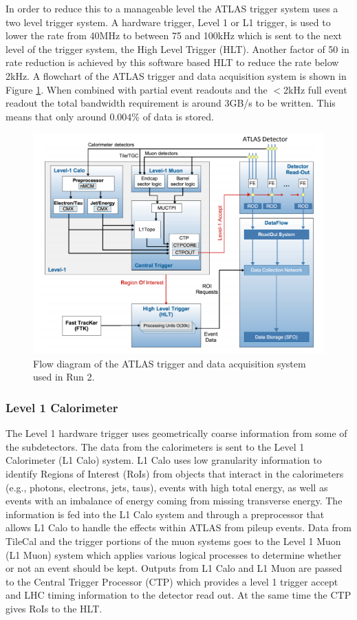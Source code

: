 In order to reduce this to a manageable level the ATLAS trigger system uses a two level trigger system.  A hardware trigger, Level 1 or L1 trigger, is used to lower the rate from 40MHz to between 75 and 100kHz which is sent to the next level of the trigger system, the High Level Trigger (HLT).  Another factor of 50 in rate reduction is achieved by this software based HLT to reduce the rate below 2kHz.  A flowchart of the ATLAS trigger and data acquisition system is shown in Figure \ref{fig:ATLAStdaq}.  When combined with partial event readouts and the $<$2kHz full event readout the total bandwidth requirement is around 3GB/s to be written.  This means that only around $0.004\%$ of data is stored.
\begin{figure}[ht!]
	\centering
	\includegraphics[width=\columnwidth]{../ThesisImages/LHCImages/ATLASTDAQR2.png}
	\caption[Flow diagram of the ATLAS trigger and data acquisition system used in Run 2.]{Flow diagram of the ATLAS trigger and data acquisition system used in Run 2\cite{ATLASTDAQ}.
	}
	\label{fig:ATLAStdaq}
\end{figure}

\subsubsection{Level 1 Calorimeter}
The Level 1 hardware trigger uses geometrically coarse information from some of the subdetectors.  The data from the calorimeters is sent to the Level 1 Calorimeter (L1 Calo) system.  L1 Calo uses low granularity information to identify Regions of Interest (RoIs) from objects that interact in the calorimeters (e.g., photons, electrons, jets, taus), events with high total energy, as well as events with an imbalance of energy coming from missing transverse energy.  The information is fed into the L1 Calo system and through a preprocessor that allows L1 Calo to handle the effects within ATLAS from pileup events.
Data from TileCal and the trigger portions of the muon systems goes to the Level 1 Muon (L1 Muon) system which applies various logical processes to determine whether or not an event should be kept.  
Outputs from L1 Calo and L1 Muon are passed to the Central Trigger Processor (CTP) which provides a level 1 trigger accept and LHC timing information to the detector read out.  At the same time the CTP gives RoIs to the HLT.

